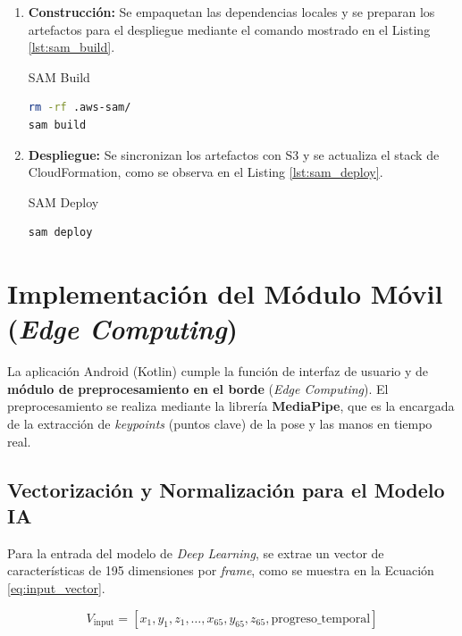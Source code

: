 \begin{enumerate}
    \item \textbf{Construcción:} Se empaquetan las dependencias locales y se preparan los artefactos para el despliegue mediante el comando mostrado en el Listing \ref{lst:sam_build}.

    \begin{codebox}{SAM Build}
        \begin{lstlisting}[language=bash, caption={SAM Build}, label={lst:sam_build}]
rm -rf .aws-sam/
sam build
        \end{lstlisting}
    \end{codebox}

    \item \textbf{Despliegue:} Se sincronizan los artefactos con S3 y se actualiza el stack de CloudFormation, como se observa en el Listing \ref{lst:sam_deploy}.

    \begin{codebox}{SAM Deploy}
        \begin{lstlisting}[language=bash, caption={SAM Deploy}, label={lst:sam_deploy}]
sam deploy
        \end{lstlisting}
    \end{codebox}
\end{enumerate}

\section{Implementación del Módulo Móvil (\textit{Edge Computing})}
\label{sec:modulo_movil}
La aplicación Android (Kotlin) cumple la función de interfaz de usuario y de \textbf{módulo de preprocesamiento en el borde} (\textit{Edge Computing}). El preprocesamiento se realiza mediante la librería \textbf{MediaPipe}, que es la encargada de la extracción de \textit{keypoints} (puntos clave) de la pose y las manos en tiempo real.

\subsection{Vectorización y Normalización para el Modelo IA}
Para la entrada del modelo de \textit{Deep Learning}, se extrae un vector de características de 195 dimensiones por \textit{frame}, como se muestra en la Ecuación \ref{eq:input_vector}.

\begin{equation}
    V_{\text{input}} = [x_1, y_1, z_1, \dots, x_{65}, y_{65}, z_{65}, \text{progreso\_temporal}]
    \label{eq:input_vector}
\end{equation}

